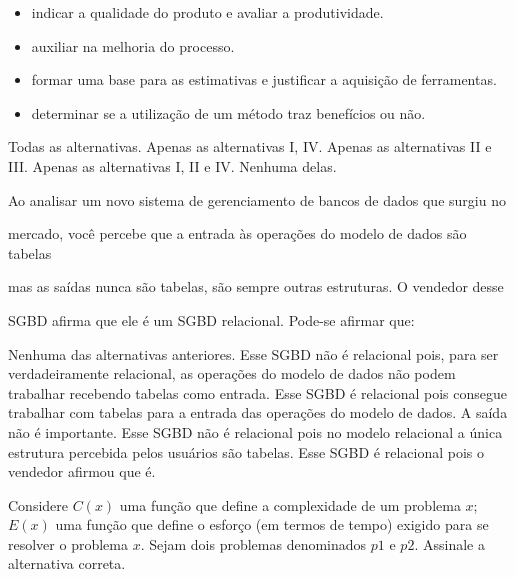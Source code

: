 \documentclass[12pt, addpoints]{exam}
\begin{document}
\begin{questions}
\begin{itemize}

    \item[I)] indicar a qualidade do produto e avaliar a produtividade.

    \item[II)] auxiliar na melhoria do processo.

    \item[III)] formar uma base para as estimativas e justificar a aquisição de ferramentas.

    \item[IV)] determinar se a utilização de um método traz benefícios ou não.

\end{itemize}
\begin{choices}
\choice Todas as alternativas.
\choice Apenas as alternativas I, IV.
\choice Apenas as alternativas II e III.
\choice Apenas as alternativas I, II e IV.
\choice Nenhuma delas.
\end{choices}

\question

Ao analisar um novo sistema de gerenciamento de bancos de dados que surgiu no

mercado, você percebe que a entrada às operações do modelo de dados são tabelas

mas as saídas nunca são tabelas, são sempre outras estruturas. O vendedor desse

SGBD afirma que ele é um SGBD relacional. Pode-se afirmar que:


\begin{choices}
\choice Nenhuma das alternativas anteriores.
\choice Esse SGBD não é relacional pois, para ser verdadeiramente relacional, as operações do modelo de dados não podem trabalhar recebendo tabelas como entrada.
\choice Esse SGBD é relacional pois consegue trabalhar com tabelas para a entrada das operações do modelo de dados. A saída não é importante.
\choice Esse SGBD não é relacional pois no modelo relacional a única estrutura percebida pelos usuários são tabelas.
\choice Esse SGBD é relacional pois o vendedor afirmou que é.
\end{choices}

\question

Considere \( C(x) \) uma função que define a complexidade de um problema \( x \); \( E(x) \) uma função que define o esforço (em termos de tempo) exigido para se resolver o problema \( x \). Sejam dois problemas denominados \( p1 \) e \( p2 \). Assinale a alternativa correta.



\end{questions}
\end{document}
